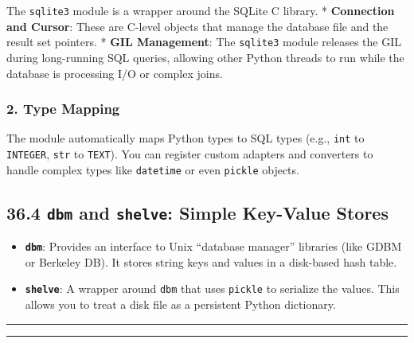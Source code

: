 The \passthrough{\lstinline!sqlite3!} module is a wrapper around the
SQLite C library. * \textbf{Connection and Cursor}: These are C-level
objects that manage the database file and the result set pointers. *
\textbf{GIL Management}: The \passthrough{\lstinline!sqlite3!} module
releases the GIL during long-running SQL queries, allowing other Python
threads to run while the database is processing I/O or complex joins.

\hypertarget{type-mapping}{%
\subsubsection{2. Type Mapping}\label{type-mapping}}

The module automatically maps Python types to SQL types (e.g.,
\passthrough{\lstinline!int!} to \passthrough{\lstinline!INTEGER!},
\passthrough{\lstinline!str!} to \passthrough{\lstinline!TEXT!}). You
can register custom adapters and converters to handle complex types like
\passthrough{\lstinline!datetime!} or even
\passthrough{\lstinline!pickle!} objects.

\hypertarget{dbm-and-shelve-simple-key-value-stores}{%
\subsection{\texorpdfstring{36.4 \texttt{dbm} and \texttt{shelve}:
Simple Key-Value
Stores}{36.4 dbm and shelve: Simple Key-Value Stores}}\label{dbm-and-shelve-simple-key-value-stores}}

\begin{itemize}
\tightlist
\item
  \textbf{\passthrough{\lstinline!dbm!}}: Provides an interface to Unix
  ``database manager'' libraries (like GDBM or Berkeley DB). It stores
  string keys and values in a disk-based hash table.
\item
  \textbf{\passthrough{\lstinline!shelve!}}: A wrapper around
  \passthrough{\lstinline!dbm!} that uses
  \passthrough{\lstinline!pickle!} to serialize the values. This allows
  you to treat a disk file as a persistent Python dictionary.
\end{itemize}

\begin{center}\rule{0.5\linewidth}{0.5pt}\end{center}

\begin{center}\rule{0.5\linewidth}{0.5pt}\end{center}
